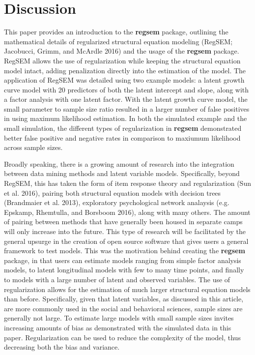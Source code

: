 \section{Discussion}\label{discussion}

This paper provides an introduction to the \textbf{regsem} package,
outlining the mathematical details of regularized structural equation
modeling (RegSEM; Jacobucci, Grimm, and McArdle 2016) and the usage of
the \textbf{regsem} package. RegSEM allows the use of regularization
while keeping the structural equation model intact, adding penalization
directly into the estimation of the model. The application of RegSEM was
detailed using two example models: a latent growth curve model with 20
predictors of both the latent intercept and slope, along with a factor
analysis with one latent factor. With the latent growth curve model, the
small parameter to sample size ratio resulted in a larger number of
false positives in using maximum likelihood estimation. In both the
simulated example and the small simulation, the different types of
regularization in \textbf{regsem} demonstrated better false positive and
negative rates in comparison to maxiumum likelihood across sample sizes.

Broadly speaking, there is a growing amount of research into the
integration between data mining methods and latent variable models.
Specifically, beyond RegSEM, this has taken the form of item response
theory and regularization (Sun et al. 2016), pairing both structural
equation models with decision trees (Brandmaier et al. 2013),
exploratory psychological network analaysis (e.g. Epskamp, Rhemtulla,
and Borsboom 2016), along with many others. The amount of pairing
between methods that have generally been housed in separate camps will
only increase into the future. This type of research will be facilitated
by the general upsurge in the creation of open source software that
gives users a general framework to test models. This was the motivation
behind creating the \textbf{regsem} package, in that users can estimate
models ranging from simple factor analysis models, to latent
longitudinal models with few to many time points, and finally to models
with a large number of latent and observed variables. The use of
regularization allows for the estimation of much larger structural
equation models than before. Specifically, given that latent variables,
as discussed in this article, are more commonly used in the social and
behavioral sciences, sample sizes are generally not large. To estimate
large models with small sample sizes invites increasing amounts of bias
as demonstrated with the simulated data in this paper. Regularization
can be used to reduce the complexity of the model, thus decreasing both
the bias and variance.

